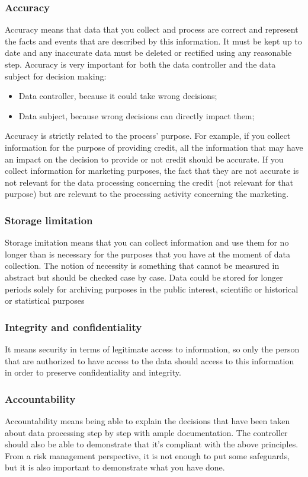 \subsubsection{Accuracy}
Accuracy means that data that you collect and process are correct and represent the facts and events that are described by this information. It must be kept up to date and any inaccurate data must be deleted or rectified using any reasonable step. Accuracy is very important for both the data controller and the data subject for decision making:
\begin{itemize}
    \item Data controller, because it could take wrong decisions;
    \item Data subject, because wrong decisions can directly impact them;
\end{itemize}
Accuracy is strictly related to the process' purpose. For example, if you collect information for the purpose of providing credit, all the information that may have an impact on the decision to provide or not credit should be accurate. If you collect information for marketing purposes, the fact that they are not accurate is not relevant for the data processing concerning the credit (not relevant for that purpose) but are relevant to the processing activity concerning the marketing.
\subsubsection{Storage limitation}
Storage imitation means that you can collect information and use them for no longer than is necessary for the purposes that you have at the moment of data collection. The notion of necessity is something that cannot be measured in abstract but should be checked case by case. Data could be stored for longer periods solely for archiving purposes in the public interest, scientific or historical or statistical purposes
\subsubsection{Integrity and confidentiality}
It means security in terms of legitimate access to information, so only the person that are authorized to have access to the data should access to this information in order to preserve confidentiality and integrity.
\subsubsection{Accountability}
Accountability means being able to explain the decisions that have been taken about data processing step by step with ample documentation. The controller should also be able to demonstrate that it's compliant with the above principles. From a risk management perspective, it is not enough to put some safeguards, but it is also important to demonstrate what you have done.
